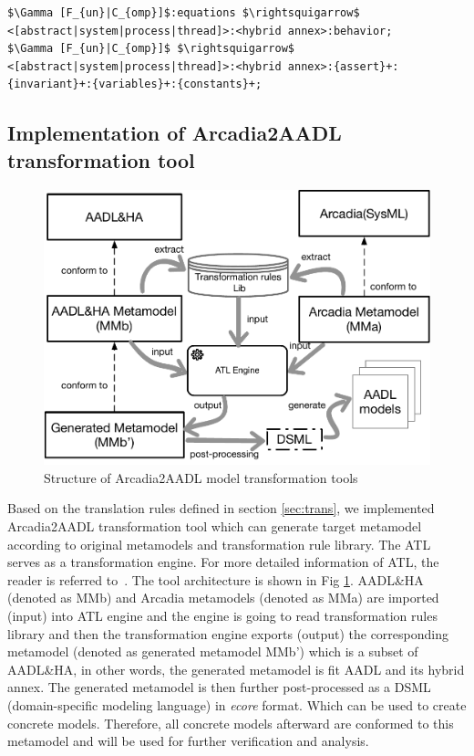 \begin{lstlisting}[caption={Translating of Hybrid Annex},label=code:ha,mathescape=true]
$\Gamma [F_{un}|C_{omp}]$:equations $\rightsquigarrow$ <[abstract|system|process|thread]>:<hybrid annex>:behavior;
$\Gamma [F_{un}|C_{omp}]$ $\rightsquigarrow$ <[abstract|system|process|thread]>:<hybrid annex>:{assert}+:{invariant}+:{variables}+:{constants}+;
\end{lstlisting}



\subsection{Implementation of Arcadia2AADL transformation tool}

\begin{figure}[!hbt]
\centering
\includegraphics[width=.95\linewidth]{img/transfer_workflow}
\caption{Structure of Arcadia2AADL model transformation tools}
\label{fig:twf}
\end{figure}

Based on the translation rules defined in section \ref{sec:trans}, we implemented Arcadia2AADL transformation tool which can generate target metamodel according to original metamodels and transformation rule library. The ATL serves as a transformation engine. For more detailed information of ATL, the reader is referred to~\cite{Jouault:2006ft}\cite{Jouault:2008bz}. 
The tool architecture is shown in Fig \ref{fig:twf}. AADL\&HA (denoted as MMb) and Arcadia metamodels (denoted as MMa) are imported (input) into ATL engine and the engine is going to read transformation rules library and then the transformation engine exports (output) the corresponding metamodel (denoted as generated metamodel MMb') which is a subset of AADL\&HA, in other words, the generated metamodel is fit AADL and its hybrid annex. The generated metamodel is then further post-processed as a DSML (domain-specific modeling language) in \textit{ecore} format. Which can be used to create concrete models. Therefore, all concrete models afterward are conformed to this metamodel and will be used for further verification and analysis.  
